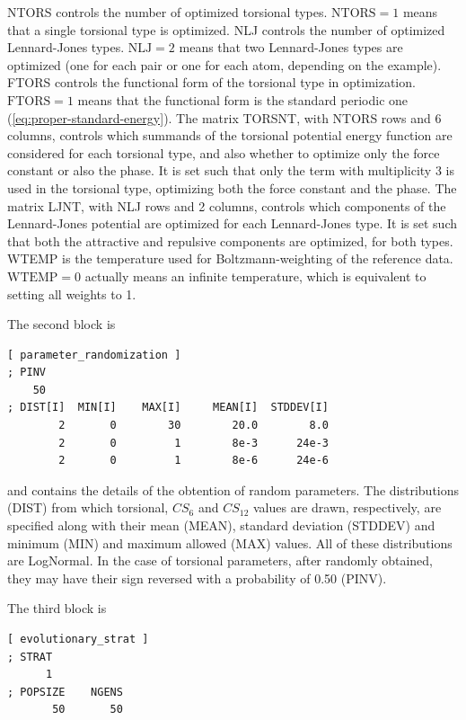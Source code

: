 \documentclass[10pt,a4paper,openany]{memoir}
\numberwithin{equation}{section}
\newcommand{\varset}[2]{$\text{#1}=#2$}
\begin{document}
\noindent
NTORS controls the number of optimized torsional types.
\varset{NTORS}{1} means that a single torsional type is optimized.
NLJ controls the number of optimized Lennard-Jones types.
\varset{NLJ}{2} means that two Lennard-Jones types are optimized (one
for each pair or one for each atom, depending on the example).  FTORS
controls the functional form of the torsional type in optimization.
\varset{FTORS}{1} means that the functional form is the standard
periodic one (\autoref{eq:proper-standard-energy}).  The matrix
TORSNT, with NTORS rows and 6 columns, controls which summands of the
torsional potential energy function are considered for each torsional
type, and also whether to optimize only the force constant or also the
phase.  It is set such that only the term with multiplicity 3 is used
in the torsional type, optimizing both the force constant and the
phase.  The matrix LJNT, with NLJ rows and 2 columns, controls which
components of the Lennard-Jones potential are optimized for each
Lennard-Jones type. It is set such that both the attractive and
repulsive components are optimized, for both types. WTEMP is the
temperature used for Boltzmann-weighting of the reference data.
\varset{WTEMP}{0} actually means an infinite temperature, which is
equivalent to setting all weights to 1.

The second block is

\begin{lstlisting}[language=gromacs]
[ parameter_randomization ]
; PINV
    50
; DIST[I]  MIN[I]    MAX[I]     MEAN[I]  STDDEV[I]
        2       0        30        20.0        8.0
        2       0         1        8e-3      24e-3
        2       0         1        8e-6      24e-6
\end{lstlisting}\vspace{2ex}\par

\noindent and contains the details of the obtention of random
parameters.
%
The distributions (DIST) from which torsional, $CS_6$ and $CS_{12}$
values are drawn, respectively, are specified along with their mean
(MEAN), standard deviation (STDDEV) and minimum (MIN) and maximum
allowed (MAX) values.
%
All of these distributions are LogNormal.
%
In the case of torsional parameters, after randomly obtained, they may
have their sign reversed with a probability of 0.50 (PINV).

The third block is

\begin{lstlisting}[language=gromacs]
[ evolutionary_strat ]
; STRAT
      1
; POPSIZE    NGENS  
       50       50
\end{lstlisting}\vspace{2ex}\par
\end{document}

